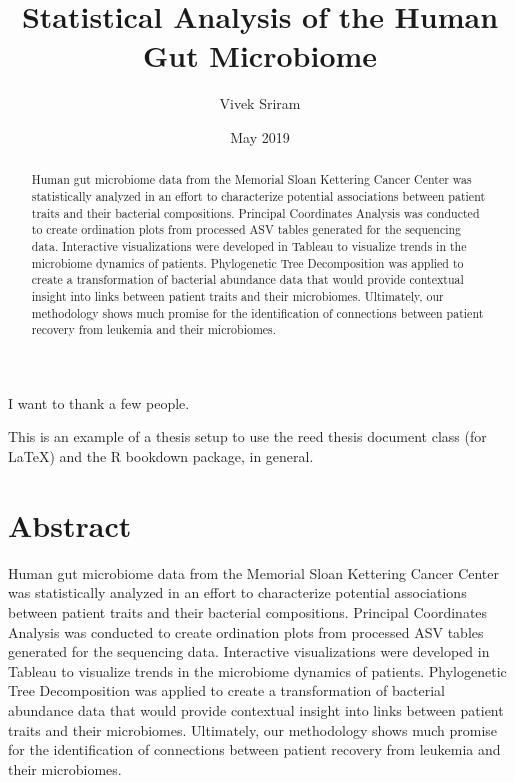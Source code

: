 \documentclass[12pt,twoside]{dukestatscithesis}
\title{Statistical Analysis of the Human Gut Microbiome}
\author{Vivek Sriram}
\date{May 2019}
\begin{document}
  \maketitle

\frontmatter %
\pagestyle{empty} %
  \begin{acknowledgements}
    I want to thank a few people.
  \end{acknowledgements}
  \begin{preface}
    This is an example of a thesis setup to use the reed thesis document
    class (for LaTeX) and the R bookdown package, in general.
  \end{preface}
  \hypersetup{linkcolor=black}
  \setcounter{tocdepth}{2}
  \tableofcontents

  \listoftables

  \listoffigures
  \begin{abstract}
    Human gut microbiome data from the Memorial Sloan Kettering Cancer
    Center was statistically analyzed in an effort to characterize potential
    associations between patient traits and their bacterial compositions.
    Principal Coordinates Analysis was conducted to create ordination plots
    from processed ASV tables generated for the sequencing data. Interactive
    visualizations were developed in Tableau to visualize trends in the
    microbiome dynamics of patients. Phylogenetic Tree Decomposition was
    applied to create a transformation of bacterial abundance data that
    would provide contextual insight into links between patient traits and
    their microbiomes. Ultimately, our methodology shows much promise for
    the identification of connections between patient recovery from leukemia
    and their microbiomes.
  \end{abstract}

\mainmatter %
\pagestyle{fancyplain} %

\chapter*{Abstract}\label{abstract}

Human gut microbiome data from the Memorial Sloan Kettering Cancer
Center was statistically analyzed in an effort to characterize potential
associations between patient traits and their bacterial compositions.
Principal Coordinates Analysis was conducted to create ordination plots
from processed ASV tables generated for the sequencing data. Interactive
visualizations were developed in Tableau to visualize trends in the
microbiome dynamics of patients. Phylogenetic Tree Decomposition was
applied to create a transformation of bacterial abundance data that
would provide contextual insight into links between patient traits and
their microbiomes. Ultimately, our methodology shows much promise for
the identification of connections between patient recovery from leukemia
and their microbiomes.
\end{document}
